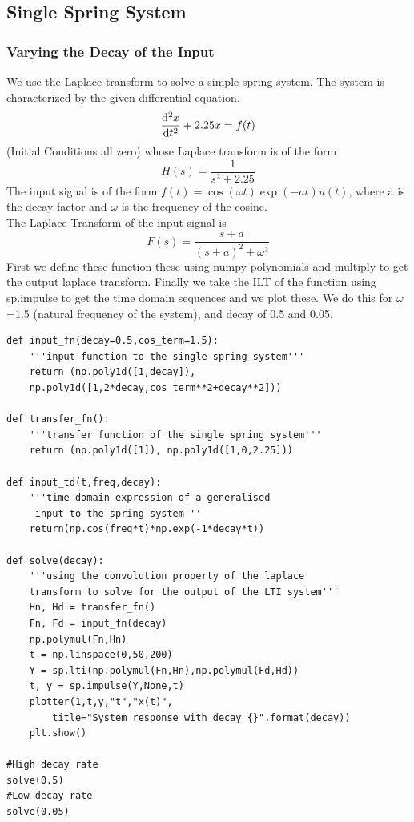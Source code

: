 \documentclass[11pt, a4paper]{article}
\begin{document}
\subsection{Single Spring System}
\subsubsection{Varying the Decay of the Input}
{
We use the Laplace transform to solve a simple spring system.
The system is characterized by the given differential equation.
\[\dv[2]{x}{t} + 2.25x = f(t) \]
(Initial Conditions all zero)
whose Laplace transform is of the form
\[H(s) =  \frac{1}{s^2+2.25}\]
The input signal is of the form 
\(f(t) = \cos{(\omega t)}\exp(-at)u(t)\),
where a is the decay factor and $\omega$ is the frequency of the cosine.\\
The Laplace Transform of the input signal is
\[ F(s) = \frac{s+a}{(s+a)^2+\omega^2 }\]
First we define these function these using numpy polynomials and multiply to get the output laplace transform.
Finally we take the ILT of the function using sp.impulse to get the time domain sequences and we plot these.
We do this for $\omega$=1.5 (natural frequency of the system), and decay of 0.5 and 0.05.
}
\begin{verbatim}
def input_fn(decay=0.5,cos_term=1.5):
    '''input function to the single spring system'''
    return (np.poly1d([1,decay]),
    np.poly1d([1,2*decay,cos_term**2+decay**2]))

def transfer_fn():
    '''transfer function of the single spring system'''
    return (np.poly1d([1]), np.poly1d([1,0,2.25]))

def input_td(t,freq,decay):
    '''time domain expression of a generalised
     input to the spring system'''
    return(np.cos(freq*t)*np.exp(-1*decay*t))

def solve(decay):
    '''using the convolution property of the laplace 
    transform to solve for the output of the LTI system'''
    Hn, Hd = transfer_fn()
    Fn, Fd = input_fn(decay)
    np.polymul(Fn,Hn)
    t = np.linspace(0,50,200)
    Y = sp.lti(np.polymul(Fn,Hn),np.polymul(Fd,Hd))
    t, y = sp.impulse(Y,None,t)
    plotter(1,t,y,"t","x(t)",
        title="System response with decay {}".format(decay))
    plt.show()

#High decay rate
solve(0.5)
#Low decay rate
solve(0.05)

\end{verbatim}
\end{document}
